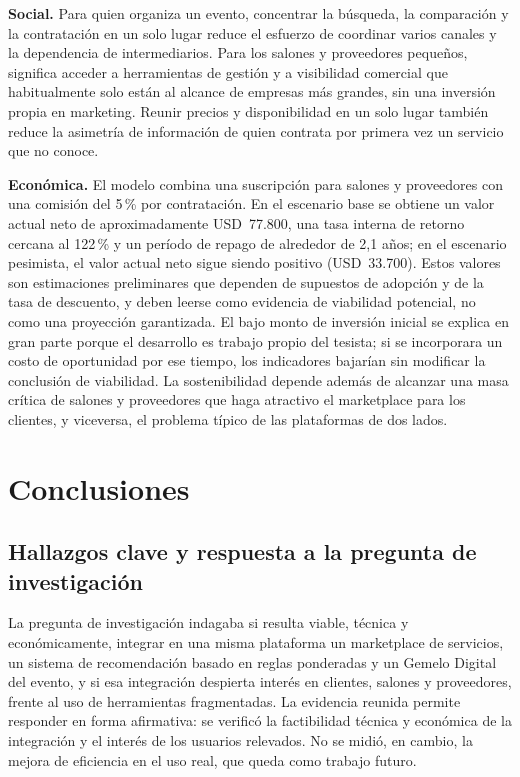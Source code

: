 \textbf{Social.} Para quien organiza un evento, concentrar la búsqueda, la
comparación y la contratación en un solo lugar reduce el esfuerzo de
coordinar varios canales y la dependencia de intermediarios. Para los
salones y proveedores pequeños, significa acceder a herramientas de
gestión y a visibilidad comercial que habitualmente solo están al
alcance de empresas más grandes, sin una inversión propia en marketing.
Reunir precios y disponibilidad en un solo lugar también reduce la
asimetría de información de quien contrata por primera vez un servicio
que no conoce.

\textbf{Económica.} El modelo combina una suscripción para salones y
proveedores con una comisión del 5\,\% por contratación. En el escenario
base se obtiene un valor actual neto de aproximadamente USD~77.800, una
tasa interna de retorno cercana al 122\,\% y un período de repago de
alrededor de 2,1 años; en el escenario pesimista, el valor actual neto
sigue siendo positivo (USD~33.700). Estos valores son estimaciones
preliminares que dependen de supuestos de adopción y de la tasa de
descuento, y deben leerse como evidencia de viabilidad potencial, no
como una proyección garantizada. El bajo monto de inversión inicial se
explica en gran parte porque el desarrollo es trabajo propio del
tesista; si se incorporara un costo de oportunidad por ese tiempo, los
indicadores bajarían sin modificar la conclusión de viabilidad. La
sostenibilidad depende además de alcanzar una masa crítica de salones y
proveedores que haga atractivo el marketplace para los clientes, y
viceversa, el problema típico de las plataformas de dos lados.

\section{Conclusiones}

\subsection{Hallazgos clave y respuesta a la pregunta de investigación}

La pregunta de investigación indagaba si resulta viable, técnica y
económicamente, integrar en una misma plataforma un marketplace de
servicios, un sistema de recomendación basado en reglas ponderadas y un
Gemelo Digital del evento, y si esa integración despierta interés en
clientes, salones y proveedores, frente al uso de herramientas
fragmentadas. La evidencia reunida permite responder en forma
afirmativa: se verificó la factibilidad técnica y económica de la
integración y el interés de los usuarios relevados. No se midió, en
cambio, la mejora de eficiencia en el uso real, que queda como trabajo
futuro.

